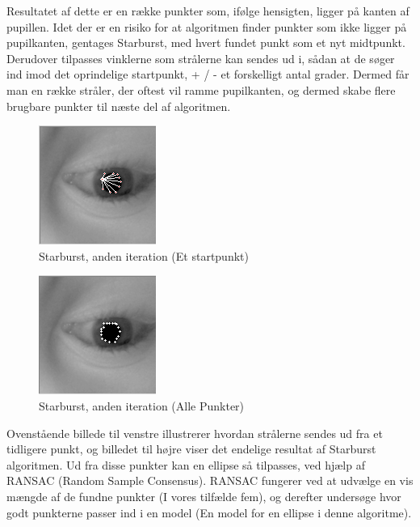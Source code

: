 \documentclass[a4paper,oneside,12pt]{article}
\begin{document}
	Resultatet af dette er en række punkter som, ifølge hensigten, ligger på kanten af pupillen. Idet der er en risiko for at algoritmen finder punkter som ikke ligger på pupilkanten, gentages Starburst, med hvert fundet punkt som et nyt midtpunkt. Derudover tilpasses vinklerne som strålerne kan sendes ud i, sådan at de søger ind imod det oprindelige startpunkt, + / - et forskelligt antal grader. Dermed får man en række stråler, der oftest vil ramme pupilkanten, og dermed skabe flere brugbare punkter til næste del af algoritmen.
	
	\begin{figure}
	\centering
	\includegraphics[width=0.4\linewidth]{Billeder/Starburst,Secondsingle.png}
	\caption{Starburst, anden iteration (Et startpunkt)}
	\label{fig:Starburst,Secondsingle}
	\end{figure}
	
	\begin{figure}
	\centering
	\includegraphics[width=0.4\linewidth]{Billeder/Starburst,Second.png}
	\caption{Starburst, anden iteration (Alle Punkter)}
	\label{fig:Starburst,Second}
	\end{figure}
		
	Ovenstående billede til venstre illustrerer hvordan strålerne sendes ud fra et tidligere punkt, og billedet til højre viser det endelige resultat af Starburst algoritmen. Ud fra disse punkter kan en ellipse så tilpasses, ved hjælp af RANSAC (Random Sample Consensus). RANSAC fungerer ved at udvælge en vis mængde af de fundne punkter (I vores tilfælde fem), og derefter undersøge hvor godt punkterne passer ind i en model (En model for en ellipse i denne algoritme).
			
\end{document}
